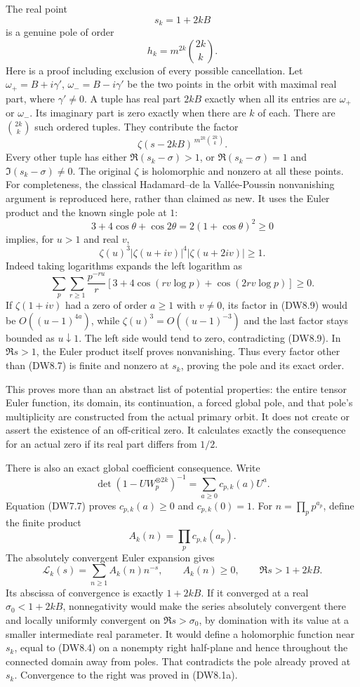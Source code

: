 The real point \[
s_k=1+2kB
\tag{DW8.5}
\] is a genuine pole of order \[
h_k=m^{2k}\binom{2k}{k}.
\tag{DW8.6}
\] Here is a proof including exclusion of every possible cancellation.
Let \(\omega_+=B+i\gamma'\), \(\omega_-=B-i\gamma'\) be the two points
in the orbit with maximal real part, where \(\gamma'\ne0\). A tuple has
real part \(2kB\) exactly when all its entries are \(\omega_+\) or
\(\omega_-\). Its imaginary part is zero exactly when there are \(k\) of
each. There are \(\binom{2k}{k}\) such ordered tuples. They contribute
the factor \[
\zeta(s-2kB)^{\,m^{2k}\binom{2k}{k}}.
\tag{DW8.7}
\] Every other tuple has either \(\Re(s_k-\sigma)>1\), or
\(\Re(s_k-\sigma)=1\) and \(\Im(s_k-\sigma)\ne0\). The original
\(\zeta\) is holomorphic and nonzero at all these points. For
completeness, the classical Hadamard--de la Vallée-Poussin nonvanishing
argument is reproduced here, rather than claimed as new. It uses the
Euler product and the known single pole at \(1\): \[
3+4\cos\theta+\cos2\theta=2(1+\cos\theta)^2\ge0
\tag{DW8.8}
\] implies, for \(u>1\) and real \(v\), \[
\zeta(u)^3|\zeta(u+iv)|^4|\zeta(u+2iv)|\ge1.
\tag{DW8.9}
\] Indeed taking logarithms expands the left logarithm as \[
\sum_p\sum_{r\ge1}\frac{p^{-ru}}r
\left[3+4\cos(rv\log p)+\cos(2rv\log p)\right]\ge0.
\tag{DW8.10}
\] If \(\zeta(1+iv)\) had a zero of order \(a\ge1\) with \(v\ne0\), its
factor in (DW8.9) would be \(O((u-1)^{4a})\), while
\(\zeta(u)^3=O((u-1)^{-3})\) and the last factor stays bounded as
\(u\downarrow1\). The left side would tend to zero, contradicting
(DW8.9). In \(\Re s>1\), the Euler product itself proves nonvanishing.
Thus every factor other than (DW8.7) is finite and nonzero at \(s_k\),
proving the pole and its exact order.

This proves more than an abstract list of potential properties: the
entire tensor Euler function, its domain, its continuation, a forced
global pole, and that pole's multiplicity are constructed from the
actual primary orbit. It does not create or assert the existence of an
off-critical zero. It calculates exactly the consequence for an actual
zero if its real part differs from \(1/2\).

There is also an exact global coefficient consequence. Write \[
\det(1-UW_p^{\otimes2k})^{-1}
=\sum_{a\ge0}c_{p,k}(a)U^a.
\tag{DW8.7a}
\] Equation (DW7.7) proves \(c_{p,k}(a)\ge0\) and \(c_{p,k}(0)=1\). For
\(n=\prod_pp^{a_p}\), define the finite product \[
A_k(n)=\prod_pc_{p,k}(a_p).
\tag{DW8.7b}
\] The absolutely convergent Euler expansion gives \[
\mathcal L_k(s)=\sum_{n\ge1}A_k(n)n^{-s},
\qquad A_k(n)\ge0,\qquad \Re s>1+2kB.
\tag{DW8.7c}
\] Its abscissa of convergence is exactly \(1+2kB\). If it converged at
a real \(\sigma_0<1+2kB\), nonnegativity would make the series
absolutely convergent there and locally uniformly convergent on
\(\Re s>\sigma_0\), by domination with its value at a smaller
intermediate real parameter. It would define a holomorphic function near
\(s_k\), equal to (DW8.4) on a nonempty right half-plane and hence
throughout the connected domain away from poles. That contradicts the
pole already proved at \(s_k\). Convergence to the right was proved in
(DW8.1a).

